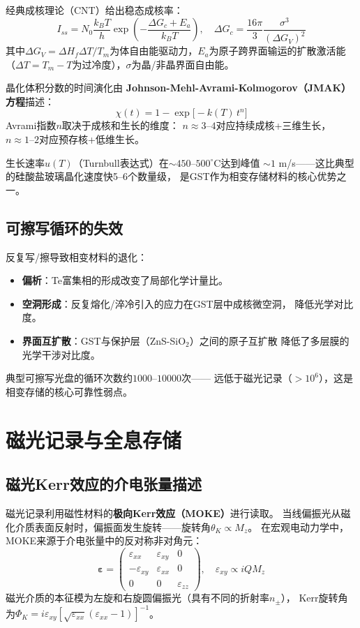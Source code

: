 \documentclass[11pt,a4paper,openany]{book}
\theoremstyle{definition}
\theoremstyle{plain}
\theoremstyle{remark}
\begin{document}
经典成核理论（CNT）给出稳态成核率：
\begin{equation}
  I_{ss} = N_0\frac{k_B T}{h}\exp\!\left( -\frac{\Delta G_c + E_a}{k_B T} \right),\quad
  \Delta G_c = \frac{16\pi}{3}\frac{\sigma^3}{(\Delta G_V)^2}
\end{equation}
其中$\Delta G_V = \Delta H_f \Delta T / T_m$为体自由能驱动力，$E_a$为原子跨界面输运的扩散激活能
（$\Delta T = T_m - T$为过冷度），$\sigma$为晶/非晶界面自由能。

晶化体积分数的时间演化由
\textbf{Johnson-Mehl-Avrami-Kolmogorov（JMAK）方程}描述：
\begin{equation}\label{eq:jmak}
  \boxed{ \chi(t) = 1 - \exp\!\bigl[ -k(T)\,t^n \bigr] }
\end{equation}
Avrami指数$n$取决于成核和生长的维度：
$n \approx 3$--$4$对应持续成核+三维生长，
$n \approx 1$--$2$对应预存核+低维生长。

生长速率$u(T)$（Turnbull表达式）在$\sim 450$--$500^\circ$C达到峰值
$\sim 1$ m/s——这比典型的硅酸盐玻璃晶化速度快5--6个数量级，
是GST作为相变存储材料的核心优势之一。

\subsection{可擦写循环的失效}

反复写/擦导致相变材料的退化：
\begin{itemize}
  \item \textbf{偏析}：Te富集相的形成改变了局部化学计量比。
  \item \textbf{空洞形成}：反复熔化/淬冷引入的应力在GST层中成核微空洞，
  降低光学对比度。
  \item \textbf{界面互扩散}：GST与保护层（ZnS-SiO$_2$）之间的原子互扩散
  降低了多层膜的光学干涉对比度。
\end{itemize}
典型可擦写光盘的循环次数约$1000$--$10000$次——
远低于磁光记录（$> 10^6$），这是相变存储的核心可靠性弱点。

\section{磁光记录与全息存储}

\subsection{磁光Kerr效应的介电张量描述}

磁光记录利用磁性材料的\textbf{极向Kerr效应（MOKE）}进行读取。
当线偏振光从磁化介质表面反射时，偏振面发生旋转——旋转角$\theta_K \propto M_z$。
在宏观电动力学中，MOKE来源于介电张量中的反对称非对角元：
\begin{equation}
  \boldsymbol{\varepsilon} =
  \begin{pmatrix}
    \varepsilon_{xx} & \varepsilon_{xy} & 0 \\
    -\varepsilon_{xy} & \varepsilon_{xx} & 0 \\
    0 & 0 & \varepsilon_{zz}
  \end{pmatrix},\quad
  \varepsilon_{xy} \propto iQM_z
\end{equation}
磁光介质的本征模为左旋和右旋圆偏振光（具有不同的折射率$n_\pm$），
Kerr旋转角为$\Phi_K = i\varepsilon_{xy}[\sqrt{\varepsilon_{xx}}(\varepsilon_{xx} - 1)]^{-1}$。
\end{document}
